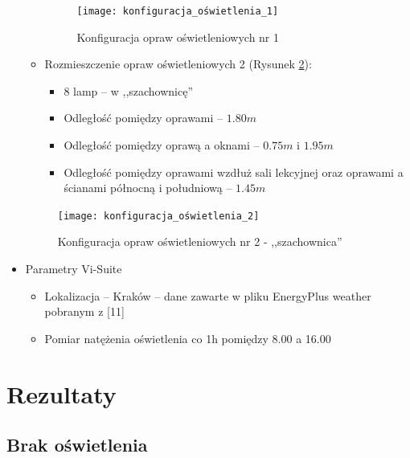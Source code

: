 \documentclass[a4paper,12pt]{article}
\begin{document}
\begin{itemize}
\begin{itemize}
		\begin{figure}[h]
			\centering
			\texttt{[image: konfiguracja\_oświetlenia\_1]}
			\caption{Konfiguracja opraw oświetleniowych nr 1}
			\label{konfiguracja_opraw_1}
		\end{figure}
	
				\item Rozmieszczenie opraw oświetleniowych 2 (Rysunek \ref{konfiguracja_opraw_2}):
			\begin{itemize}
				\item 8 lamp -- w ,,szachownicę''
				\item Odległość pomiędzy oprawami -- $1.80m$
				\item Odległość pomiędzy oprawą a oknami -- $0.75m$ i $1.95m$
				\item Odległość pomiędzy oprawami wzdłuż sali lekcyjnej oraz oprawami a ścianami północną i południową -- $1.45m$
			\end{itemize}	
		\end{itemize}
	
		\begin{figure}[h]
			\centering
			\texttt{[image: konfiguracja\_oświetlenia\_2]}
			\caption{Konfiguracja opraw oświetleniowych nr 2 - ,,szachownica''}
			\label{konfiguracja_opraw_2}
		\end{figure}
		
		\newpage
		\item Parametry Vi-Suite
		\begin{itemize}
			\item Lokalizacja -- Kraków -- dane zawarte w pliku EnergyPlus weather pobranym z [11]
			\item Pomiar natężenia oświetlenia co 1h pomiędzy 8.00 a 16.00
		\end{itemize}		
		
	\end{itemize}

	\section{Rezultaty}
	\label{sec:rezultaty}
	
	\subsection{Brak oświetlenia}
	\label{sec:brak_oswietlenia}
	
\end{document}
